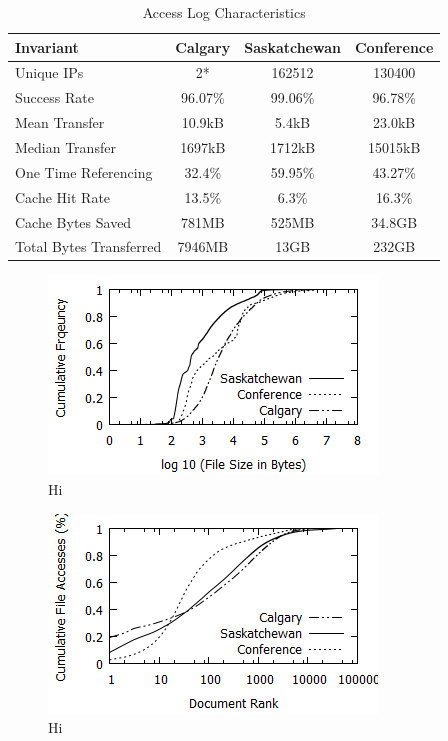 \documentclass[10pt,conference]{IEEEtran}
\begin{document}
\begin{table}
    \caption{Access Log Characteristics}
    \begin{tabular}[ht!]{ | l || c | c | c | }
        \hline
        Invariant & Calgary & Saskatchewan & Conference \\
        \hline
        Unique IPs & 2* & 162512 & 130400 \\
        Success Rate & 96.07\% & 99.06\% & 96.78\% \\
        Mean Transfer & 10.9kB & 5.4kB & 23.0kB \\
        Median Transfer & 1697kB & 1712kB & 15015kB \\
        One Time Referencing & 32.4\% & 59.95\% & 43.27\% \\
        Cache Hit Rate & 13.5\% & 6.3\% & 16.3\% \\
        Cache Bytes Saved & 781MB & 525MB & 34.8GB \\
        Total Bytes Transferred & 7946MB & 13GB & 232GB \\
        \hline
    \end{tabular}
\end{table}

\begin{figure}
    \includegraphics{images/filesize}
    \caption{Hi}\label{fig:filesize}
\end{figure}

\begin{figure}
    \includegraphics{images/concentration}
    \caption{Hi}\label{fig:file_accesses}
\end{figure}
\end{document}
